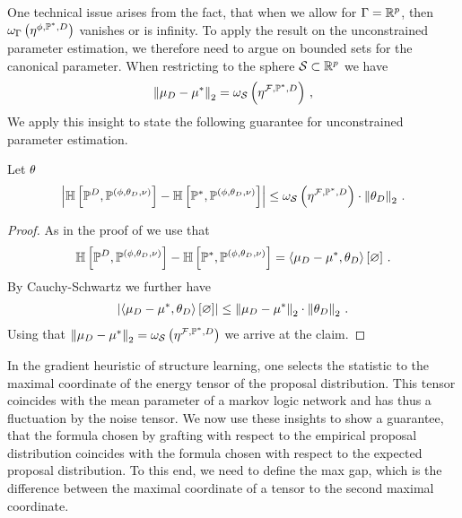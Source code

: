 One technical issue arises from the fact, that when we allow for $\Gamma=\mathbb{R}^{p}$, then $\omega_{\Gamma}\left(\eta^{\phi,\mathbb{P}^*,D}\right)$ vanishes or is infinity.
To apply the result on the unconstrained parameter estimation, we therefore need to argue on bounded sets for the canonical parameter.
When restricting to the sphere $\mathcal{S}\subset\mathbb{R}^{p}$ we have
\begin{align*}
    \left\|\mu_{D}-\mu^*\right\|_{2} = \omega_{\mathcal{S}}\left(\eta^{\mathcal{F},\mathbb{P}^*,D}\right) \, ,
\end{align*}
We apply this insight to state the following guarantee for unconstrained parameter estimation.
\begin{theorem}
    \label{the:detGuaranteeUnconstrained}
    Let $\theta$
    \begin{align*}
        \left|\mathbb{H}\left[\mathbb{P}^{D},\mathbb{P}^{(\phi,\theta_{D},\nu)}\right]-\mathbb{H}\left[\mathbb{P}^*,\mathbb{P}^{(\phi,\theta_{D},\nu)}\right]\right|
        \leq \omega_{\mathcal{S}}\left(\eta^{\mathcal{F},\mathbb{P}^*,D}\right) \cdot \left\|\theta_{D}\right\|_{2} \, .
    \end{align*}
\end{theorem}
\begin{proof}
    As in the proof of  we use that
    \begin{align*}
        \mathbb{H}\left[\mathbb{P}^{D},\mathbb{P}^{(\phi,\theta_{D},\nu)}\right]-\mathbb{H}\left[\mathbb{P}^*,\mathbb{P}^{(\phi,\theta_{D},\nu)}\right]
        = \left\langle \mu_{D}-\mu^*,\theta_{D}\right\rangle \left[ \varnothing \right]  \, .
    \end{align*}
    By Cauchy-Schwartz we further have
    \begin{align*}
        \left|\left\langle \mu_{D}-\mu^*,\theta_{D}\right\rangle \left[ \varnothing \right]\right| \leq \left\|\mu_{D}-\mu^*\right\|_{2}\cdot\left\|\theta_{D}\right\|_{2} \, .
    \end{align*}
    Using that $\left\|\mu_{D}-\mu^*\right\|_{2}=\omega_{\mathcal{S}}\left(\eta^{\mathcal{F},\mathbb{P}^*,D}\right)$ we arrive at the claim.
\end{proof}


In the gradient heuristic of structure learning, one selects the statistic to the maximal coordinate of the energy tensor of the proposal distribution.
This tensor coincides with the mean parameter of a markov logic network and has thus a fluctuation by the noise tensor.
We now use these insights to show a guarantee, that the formula chosen by grafting with respect to the empirical proposal distribution coincides with the formula chosen with respect to the expected proposal distribution.
To this end, we need to define the max gap, which is the difference between the maximal coordinate of a tensor to the second maximal coordinate.

